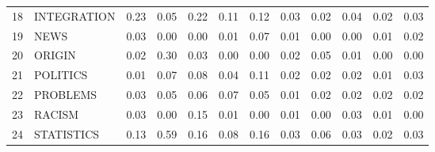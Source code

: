 \begin{table}[ht]
\begin{tabular}{rlrrrrrrrrrr}
  18 & INTEGRATION & 0.23 & 0.05 & 0.22 & 0.11 & 0.12 & 0.03 & 0.02 & 0.04 & 0.02 & 0.03 \\ 
  19 & NEWS & 0.03 & 0.00 & 0.00 & 0.01 & 0.07 & 0.01 & 0.00 & 0.00 & 0.01 & 0.02 \\ 
  20 & ORIGIN & 0.02 & 0.30 & 0.03 & 0.00 & 0.00 & 0.02 & 0.05 & 0.01 & 0.00 & 0.00 \\ 
  21 & POLITICS & 0.01 & 0.07 & 0.08 & 0.04 & 0.11 & 0.02 & 0.02 & 0.02 & 0.01 & 0.03 \\ 
  22 & PROBLEMS & 0.03 & 0.05 & 0.06 & 0.07 & 0.05 & 0.01 & 0.02 & 0.02 & 0.02 & 0.02 \\ 
  23 & RACISM & 0.03 & 0.00 & 0.15 & 0.01 & 0.00 & 0.01 & 0.00 & 0.03 & 0.01 & 0.00 \\ 
  24 & STATISTICS & 0.13 & 0.59 & 0.16 & 0.08 & 0.16 & 0.03 & 0.06 & 0.03 & 0.02 & 0.03 \\ 
   \hline
\end{tabular}
\end{table}

